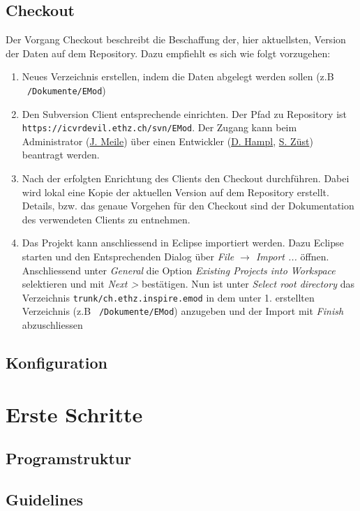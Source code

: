 \documentclass[a4paper,11pt,pdftex,twoside]{scrartcl}
\makeatletter
\newcommand{\iwfadmin}{Administrator (\href{mailto:meile@iwf.mavt.ethz.ch}{J. Meile})\xspace}
\newcommand{\developper}{Entwickler (\href{mailto:hampl@iwf.mavt.ethz.ch}{D. Hampl}, \href{mailto:sizuest@inspire.ethz.ch}{S. Züst})\xspace}
\makeatother
\begin{document}
\subsection{Checkout}
Der Vorgang Checkout beschreibt die Beschaffung der, hier aktuellsten, Version der Daten auf dem Repository.
Dazu empfiehlt es sich wie folgt vorzugehen:
\begin{enumerate}
	\item Neues Verzeichnis erstellen, indem die Daten abgelegt werden sollen (z.B \texttt{~/Dokumente/EMod})
	\item Den Subversion Client entsprechende einrichten. Der Pfad zu Repository ist \\\texttt{https://icvrdevil.ethz.ch/svn/EMod}.
	Der Zugang kann beim \iwfadmin über einen \developper beantragt werden.
	\item Nach der erfolgten Enrichtung des Clients den Checkout durchführen.
	Dabei wird lokal eine Kopie der aktuellen Version auf dem Repository erstellt.
	Details, bzw. das genaue Vorgehen für den Checkout sind der Dokumentation des verwendeten Clients zu entnehmen. 	
	\item Das Projekt kann anschliessend in Eclipse importiert werden. Dazu Eclipse starten und den Entsprechenden Dialog über \emph{File $\rightarrow$ Import ...} öffnen.
	Anschliessend unter \emph{General} die Option \emph{Existing Projects into Workspace} selektieren und mit \emph{Next >} bestätigen.
	Nun ist unter \emph{Select root directory} das Verzeichnis \texttt{trunk/ch.ethz.inspire.emod} in dem unter 1. erstellten Verzeichnis (z.B \texttt{~/Dokumente/EMod}) anzugeben und der Import mit \emph{Finish} abzuschliessen
\end{enumerate}



\subsection{Konfiguration}

\section{Erste Schritte}

\subsection{Programstruktur}

\subsection{Guidelines}
\end{document}
